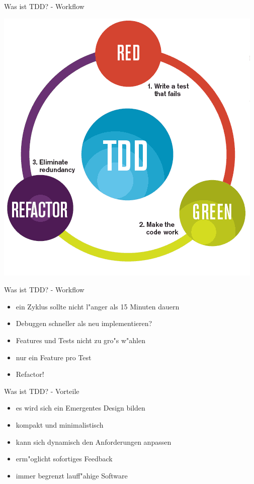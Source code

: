 \documentclass{beamer}
\begin{document}
  \begin{frame}{Was ist TDD? - Workflow}
    \begin{center}
      \includegraphics[scale=0.3]{../doc/assets/tdd_flow.png}
    \end{center}
  \end{frame}

  \begin{frame}{Was ist TDD? - Workflow}
    \begin{itemize}
      \item ein Zyklus sollte nicht l"anger als 15 Minuten dauern
      \item Debuggen schneller als neu implementieren?
      \item Features und Tests nicht zu gro"s w"ahlen
      \item nur ein Feature pro Test
      \item Refactor!
    \end{itemize}
  \end{frame}

  \begin{frame}{Was ist TDD? - Vorteile}
    \begin{itemize}
      \item es wird sich ein Emergentes Design bilden
      \item kompakt und minimalistisch
      \item kann sich dynamisch den Anforderungen anpassen
      \item erm"oglicht sofortiges Feedback
      \item immer begrenzt lauff"ahige Software
    \end{itemize}
  \end{frame}
\end{document}
